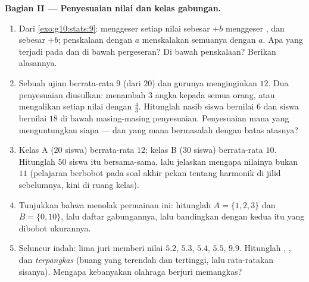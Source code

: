 \begin{problem}
\medskip
\noindent\textbf{Bagian II --- Penyesuaian nilai dan kelas gabungan.}
\begin{enumerate}[resume]
  \item Dari \cref{exo:g10:stats:9}: menggeser setiap nilai sebesar
        $+b$ menggeser ,  dan  sebesar $+b$; penskalaan
        dengan $a$ menskalakan semuanya dengan $a$. Apa yang terjadi pada
         dan  di bawah pergeseran? Di bawah
        penskalaan? Berikan alasannya.
  \item Sebuah ujian berrata-rata $9$ (dari $20$) dan gurunya menginginkan
         $12$. Dua penyesuaian diusulkan: menambah $3$ angka kepada
        semua orang, atau mengalikan setiap nilai dengan $\frac43$. Hitunglah
        nasib siswa bernilai $6$ dan siswa bernilai $18$ di bawah masing-masing
        penyesuaian. Penyesuaian mana yang menguntungkan siapa --- dan yang
        mana bermasalah dengan batas atasnya?
  \item Kelas A ($20$ siswa) berrata-rata $12$; kelas B ($30$
        siswa) berrata-rata $10$. Hitunglah  $50$
        siswa itu bersama-sama, lalu jelaskan mengapa nilainya bukan $11$
        (pelajaran  berbobot pada soal akhir pekan tentang 
        harmonik di jilid sebelumnya, kini di ruang kelas).
  \item Tunjukkan bahwa  menolak permainan ini: hitunglah 
        $A = \{1, 2, 3\}$ dan $B = \{0, 10\}$, lalu
         daftar gabungannya, lalu bandingkan dengan
         kedua  itu yang dibobot ukurannya.
  \item Seluncur indah: lima juri memberi nilai $5.2$, $5.3$, $5.4$,
        $5.5$, $9.9$. Hitunglah , , dan
        \emph{ terpangkas} (buang yang terendah dan tertinggi, lalu
        rata-ratakan sisanya). Mengapa kebanyakan olahraga berjuri memangkas?
\end{enumerate}


\end{problem}
